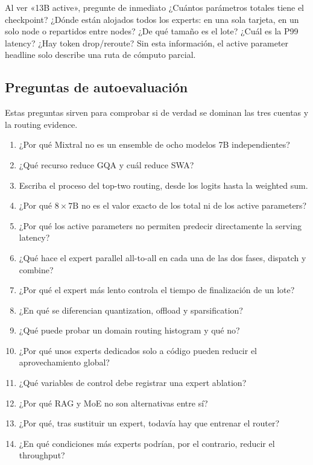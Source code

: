 \begin{warningbox}{Al ver «13B active», pregunte de inmediato}
¿Cuántos parámetros totales tiene el checkpoint? ¿Dónde están alojados todos los experts: en una sola tarjeta, en un solo node o repartidos entre nodes? ¿De qué tamaño es el lote? ¿Cuál es la P99 latency? ¿Hay token drop/reroute? Sin esta información, el active parameter headline solo describe una ruta de cómputo parcial.
\end{warningbox}

\subsection{Preguntas de autoevaluación}

Estas preguntas sirven para comprobar si de verdad se dominan las tres cuentas y la routing evidence.

\begin{enumerate}
  \item ¿Por qué Mixtral no es un ensemble de ocho modelos 7B independientes?
  \item ¿Qué recurso reduce GQA y cuál reduce SWA?
  \item Escriba el proceso del top-two routing, desde los logits hasta la weighted sum.
  \item ¿Por qué $8\times 7\mathrm{B}$ no es el valor exacto de los total ni de los active parameters?
  \item ¿Por qué los active parameters no permiten predecir directamente la serving latency?
  \item ¿Qué hace el expert parallel all-to-all en cada una de las dos fases, dispatch y combine?
  \item ¿Por qué el expert más lento controla el tiempo de finalización de un lote?
  \item ¿En qué se diferencian quantization, offload y sparsification?
  \item ¿Qué puede probar un domain routing histogram y qué no?
  \item ¿Por qué unos experts dedicados solo a código pueden reducir el aprovechamiento global?
  \item ¿Qué variables de control debe registrar una expert ablation?
  \item ¿Por qué RAG y MoE no son alternativas entre sí?
  \item ¿Por qué, tras sustituir un expert, todavía hay que entrenar el router?
  \item ¿En qué condiciones más experts podrían, por el contrario, reducir el throughput?
\end{enumerate}

